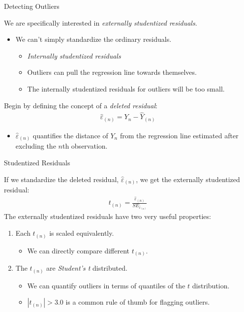 \documentclass{beamer}\usepackage[]{graphicx}\usepackage[]{color}
\begin{document}

\begin{frame}{Detecting Outliers}
  
  We are specifically interested in \emph{externally studentized residuals}.
  \vb
  \begin{itemize}
  \item We can't simply standardize the ordinary residuals.
    \begin{itemize}
    \item \emph{Internally studentized residuals}
      \vc
    \item Outliers can pull the regression line towards themselves.
      \vc
    \item The internally studentized residuals for outliers will be too small.
    \end{itemize}
  \end{itemize}
  \vb
  Begin by defining the concept of a \emph{deleted residual}:
  \begin{align*}
    \hat{\varepsilon}_{(n)} = Y_n - \hat{Y}_{(n)}
  \end{align*}
  \begin{itemize}
    \item $\hat{\varepsilon}_{(n)}$ quantifies the distance of $Y_n$ from the 
      regression line estimated after excluding the $n$th observation.
  \end{itemize}
  
\end{frame}


\begin{frame}{Studentized Residuals}
  
  If we standardize the deleted residual, $\hat{\varepsilon}_{(n)}$, we get the 
  externally studentized residual:
  \begin{align*}
    t_{(n)} = \frac{\hat{\varepsilon}_{(n)}}{SE_{\hat{\varepsilon}_{(n)}}}
  \end{align*}
  The externally studentized residuals have two very useful properties:
  \vb
  \begin{enumerate}
  \item Each $t_{(n)}$ is scaled equivalently.
    \vc
    \begin{itemize}
    \item We can directly compare different $t_{(n)}$.
    \end{itemize}
    \vb
  \item The $t_{(n)}$ are \emph{Student's t} distributed.
    \vc
    \begin{itemize}
    \item We can quantify outliers in terms of quantiles of the $t$
      distribution.
      \vc
    \item $|t_{(n)}| > 3.0$ is a common rule of thumb for flagging outliers.
    \end{itemize}
  \end{enumerate}
  
\end{frame}
\end{document}
